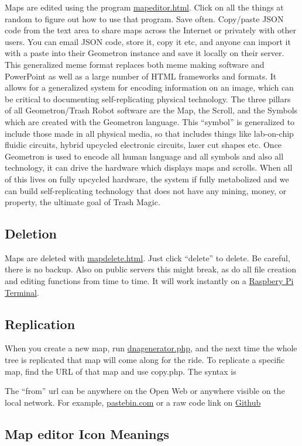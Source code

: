 Maps are edited using the program \url{mapeditor.html}. Click on all the
things at random to figure out how to use that program. Save often.
Copy/paste JSON code from the text area to share maps across the
Internet or privately with other users. You can email JSON code, store
it, copy it etc, and anyone can import it with a paste into their
Geometron instance and save it locally on their server. This generalized
meme format replaces both meme making software and PowerPoint as well as
a large number of HTML frameworks and formats. It allows for a
generalized system for encoding information on an image, which can be
critical to documenting self-replicating physical technology. The three
pillars of all Geometron/Trash Robot software are the Map, the Scroll,
and the Symbols which are created with the Geometron language. This
``symbol'' is generalized to include those made in all physical media,
so that includes things like lab-on-chip fluidic circuits, hybrid
upcycled electronic circuits, laser cut shapes etc. Once Geometron is
used to encode all human language and all symbols and also all
technology, it can drive the hardware which displays maps and scrolls.
When all of this lives on fully upcycled hardware, the system if fully
metabolized and we can build self-replicating technology that does not
have any mining, money, or property, the ultimate goal of Trash Magic.

\subsection{Deletion}\label{deletion}

Maps are deleted with \url{mapdelete.html}. Just click ``delete'' to
delete. Be careful, there is no backup. Also on public servers this
might break, as do all file creation and editing functions from time to
time. It will work instantly on a \href{scrolls/terminal}{Raspbery Pi
Terminal}.

\subsection{Replication}\label{replication}

When you create a new map, run \url{dnagenerator.php}, and the next time
the whole tree is replicated that map will come along for the ride. To
replicate a specific map, find the URL of that map and use copy.php. The
syntax is

The ``from'' url can be anywhere on the Open Web or anywhere visible on
the local network. For example,
\href{https://www.pastebin.com}{pastebin.com} or a raw code link on
\href{https://www.github.com}{Github}

\subsection{Map editor Icon Meanings}\label{map-editor-icon-meanings}

